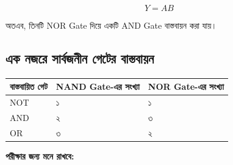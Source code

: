 \[
\boxed{Y=AB}
\]

অতএব, তিনটি \textenglish{NOR Gate} দিয়ে
একটি \textenglish{AND Gate} বাস্তবায়ন করা যায়।

\par\endgroup



\subsection{এক নজরে সার্বজনীন গেটের বাস্তবায়ন}

\begin{center}

\begin{tabularx}{\textwidth}
{|L{0.28\textwidth}|C{0.28\textwidth}|Y|}
\hline

\textbf{বাস্তবায়িত গেট} &
\textbf{\textenglish{NAND Gate}-এর সংখ্যা} &
\textbf{\textenglish{NOR Gate}-এর সংখ্যা}
\\
\hline

\textenglish{NOT} &
১ &
১
\\
\hline

\textenglish{AND} &
২ &
৩
\\
\hline

\textenglish{OR} &
৩ &
২
\\
\hline

\end{tabularx}
\end{center}



\par\begingroup

\textbf{পরীক্ষার জন্য মনে রাখবে:}


